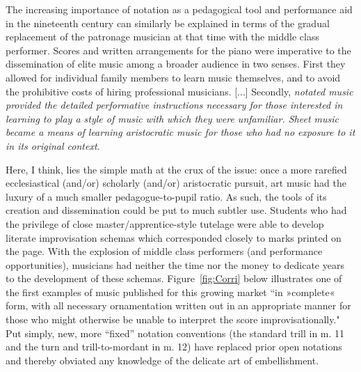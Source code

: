         \begin{smallquote}
            The increasing importance of notation as a pedagogical tool and performance aid in the nineteenth century can similarly be explained in terms of the gradual replacement of the patronage musician at that time with the middle class performer. Scores and written arrangements for the piano were imperative to the dissemination of elite music among a broader audience in two senses. First they allowed for individual family members to learn music themselves, and to avoid the prohibitive costs of hiring professional musicians. [...] Secondly, \textit{notated music provided the detailed performative instructions necessary for those interested in learning to play a style of music with which they were unfamiliar. Sheet music became a means of learning aristocratic music for those who had no exposure to it in its original context.\autocite[72]{Moore_1992}}
        \end{smallquote}

    Here, I think, lies the simple math at the crux of the issue: once a more rarefied ecclesiastical (and/or) scholarly (and/or) aristocratic pursuit, art music had the luxury of a much smaller pedagogue-to-pupil ratio. As such, the tools of its creation and dissemination could be put to much subtler use. Students who had the privilege of close master/apprentice-style tutelage were able to develop literate improvisation schemas which corresponded closely to marks printed on the page. With the explosion of middle class performers (and performance opportunities), musicians had neither the time nor the money to dedicate years to the development of these schemas. Figure~\ref{fig:Corri} below illustrates one of the first examples of music published for this growing market ``in »complete« form, with all necessary ornamentation written out in an appropriate manner for those who might otherwise be unable to interpret the score improvisationally."\autocite[72]{Moore_1992} Put simply, new, more ``fixed'' notation conventions (the standard trill in m. 11 and the turn and trill-to-mordant in m. 12) have replaced prior open notations and thereby obviated any knowledge of the delicate art of embellishment.

